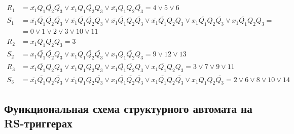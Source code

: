 \documentclass[12pt, a4paper]{article}
\begin{document}
\begin{align*}
  R_1 &= \bar{x_1}Q_1\bar{Q_2}\bar{Q_3} \lor \bar{x_1}Q_1\bar{Q_2}Q_3 \lor \bar{x_1}Q_1Q_2\bar{Q_3} = 4 \lor 5 \lor 6\\
  S_1 &= \bar{x_1}\bar{Q_1}\bar{Q_2}\bar{Q_3} \lor \bar{x_1}\bar{Q_1}\bar{Q_2}Q_3 \lor \bar{x_1}\bar{Q_1}Q_2\bar{Q_3} \lor \bar{x_1}\bar{Q_1}Q_2Q_3 \lor x_1\bar{Q_1}Q_2\bar{Q_3} \lor x_1\bar{Q_1}Q_2Q_3 =\\
  &= 0 \lor 1 \lor 2 \lor 3 \lor 10 \lor 11\\
  R_2 &= \bar{x_1}\bar{Q_1}Q_2Q_3 = 3\\
  S_2 &= x_1\bar{Q_1}\bar{Q_2}Q_3 \lor x_1Q_1\bar{Q_2}\bar{Q_3} \lor x_1Q_1\bar{Q_2}Q_3 = 9 \lor 12 \lor 13\\
  R_3 &= \bar{x_1}\bar{Q_1}Q_2Q_3 \lor \bar{x_1}Q_1Q_2Q_3 \lor x_1\bar{Q_1}\bar{Q_2}Q_3 \lor x_1\bar{Q_1}Q_2Q_3 = 3 \lor 7 \lor 9 \lor 11\\
  S_3 &= \bar{x_1}\bar{Q_1}Q_2\bar{Q_3} \lor \bar{x_1}Q_1Q_2\bar{Q_3} \lor x_1\bar{Q_1}\bar{Q_2}\bar{Q_3} \lor x_1\bar{Q_1}Q_2\bar{Q_3} \lor x_1Q_1Q_2\bar{Q_3} = 2 \lor 6 \lor 8 \lor 10 \lor 14
\end{align*}

\subsection*{Функциональная схема структурного автомата на RS-триггерах}
\end{document}
